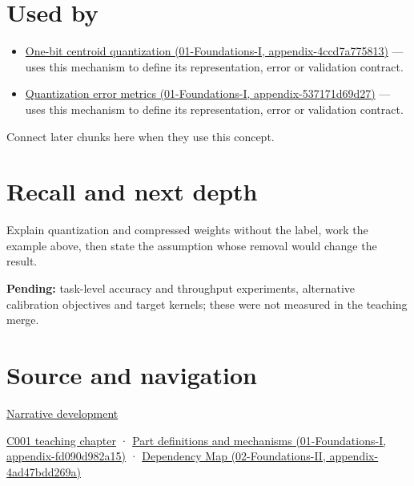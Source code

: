 \section{Used by}\label{appendix-fdc7879e8bf2-used-by}

\begin{itemize}
\tightlist
\item
  \href{../01-Foundations-I/main.pdf\#nameddest=appendix-4ccd7a775813}{One-bit centroid quantization (01-Foundations-I, appendix-4ccd7a775813)} --- uses this mechanism to define its representation, error or validation contract.
\item
  \href{../01-Foundations-I/main.pdf\#nameddest=appendix-537171d69d27}{Quantization error metrics (01-Foundations-I, appendix-537171d69d27)} --- uses this mechanism to define its representation, error or validation contract.
\end{itemize}

Connect later chunks here when they use this concept.

\section{Recall and next depth}\label{appendix-fdc7879e8bf2-recall-and-next-depth}

Explain quantization and compressed weights without the label, work the example above, then state the assumption whose removal would change the result.

\textbf{Pending:} task-level accuracy and throughput experiments, alternative calibration objectives and target kernels; these were not measured in the teaching merge.

\section{Source and navigation}\label{appendix-fdc7879e8bf2-source-and-navigation}

\href{Continuous\%20Notes/Computing\%20Foundations\%20-\%20From\%20Bits\%20to\%20C++\%20and\%20Systems\%20APIs\#Choosing\%20what\%20information\%20to\%20keep}{Narrative development}

\href{Continuous\%20Notes/Computing\%20Foundations\%20-\%20From\%20Bits\%20to\%20C++\%20and\%20Systems\%20APIs\#From\%20a\%20signal\%20to\%20an\%20interpretation}{C001 teaching chapter} · \href{../01-Foundations-I/main.pdf\#nameddest=appendix-fd090d982a15}{Part definitions and mechanisms (01-Foundations-I, appendix-fd090d982a15)} · \href{../02-Foundations-II/main.pdf\#nameddest=appendix-4ad47bdd269a}{Dependency Map (02-Foundations-II, appendix-4ad47bdd269a)}
